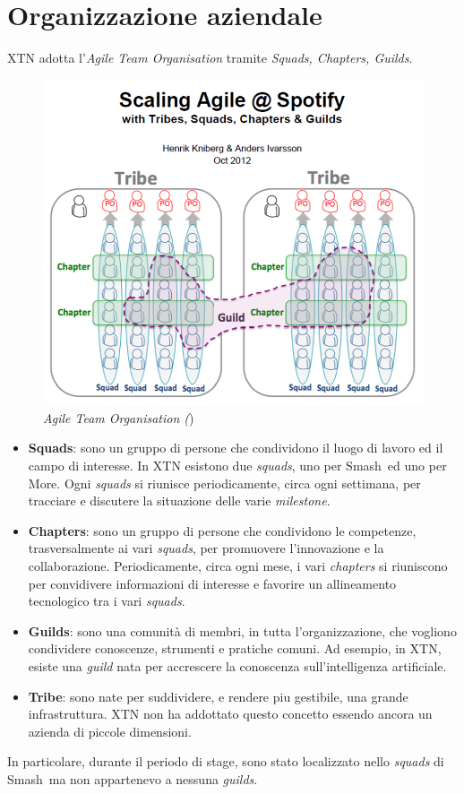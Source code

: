 \section{Organizzazione aziendale}
XTN adotta l'\textit{Agile Team Organisation} tramite \textit{Squads, Chapters, Guilds}.
\begin{figure}[ht]
	\centering
	\includegraphics[scale=0.6]{immagini/agile-org.png}
	\caption{\textit{Agile Team Organisation (})}
\end{figure}
\begin{itemize}
\item{\textbf{Squads}:} sono un gruppo di persone che condividono il luogo di lavoro ed il campo di interesse. In XTN esistono due \textit{squads}, uno per  Smash\textregistered\ ed uno per More\textregistered. Ogni \textit{squads} si riunisce periodicamente, circa ogni settimana, per tracciare e discutere la situazione delle varie \textit{milestone}. 
\item{\textbf{Chapters}:} sono un gruppo di persone che condividono le competenze, trasversalmente ai vari \textit{squads}, per promuovere l'innovazione e la collaborazione. Periodicamente, circa ogni mese, i vari \textit{chapters} si riuniscono per convidivere informazioni di interesse e favorire un allineamento tecnologico tra i vari \textit{squads}.
\item{\textbf{Guilds}:} sono una comunità di membri, in tutta l'organizzazione, che vogliono condividere conoscenze, strumenti e pratiche comuni. Ad esempio, in XTN, esiste una \textit{guild} nata per accrescere la conoscenza sull'intelligenza artificiale.
\item{\textbf{Tribe}:} sono nate per suddividere, e rendere piu gestibile, una grande infrastruttura. XTN non ha addottato questo concetto essendo ancora un azienda di piccole dimensioni.
\end{itemize}
In particolare, durante il periodo di stage, sono stato localizzato nello \textit{squads} di Smash\textregistered\, ma non appartenevo a nessuna \textit{guilds}.
\newpage

